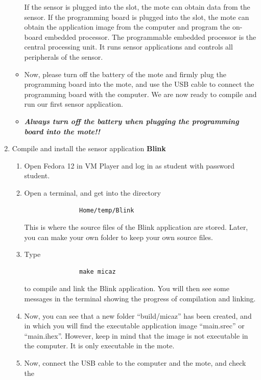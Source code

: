 \documentclass[letterpaper,12pt]{article}
\begin{document}
\begin{enumerate}
\begin{itemize}
               If the sensor is plugged into the slot, the mote can obtain data from the
               sensor. If the programming board is plugged into the slot, the mote can
               obtain the application image from the computer and program the on-board
               embedded processor. The programmable embedded processor is the central
               processing unit. It runs sensor applications and controls all peripherals
               of the sensor.
         \item Now, please turn off the battery of the mote and firmly plug the programming
               board into the mote, and use the USB cable to connect the programming board
               with the computer. We are now ready to compile and run our first sensor application.
         \item \emph{\textbf{Always turn off the battery when plugging the programming board into the mote!!}}
      \end{itemize}
   \item Compile and install the sensor application \textbf{Blink}
      \begin{enumerate}
         \item Open Fedora 12 in VM Player and log in as student with password student.
         \item Open a terminal, and get into the directory 
               \begin{lstlisting}
               Home/temp/Blink
               \end{lstlisting}
               This is where the source files of the Blink application are stored.
               Later, you can make your own folder to keep your own source files.
         \item Type 
               \begin{lstlisting}
               make micaz
               \end{lstlisting}
               to compile and link the Blink application. You will then see some messages in
               the terminal showing the progress of compilation and linking.
         \item Now, you can see that a new folder “build/micaz” has been created, and in
               which you will find the executable application image “main.srec” or “main.ihex”.
               However, keep in mind that the image is not executable in the computer.
               It is only executable in the mote.
         \item Now, connect the USB cable to the computer and the mote, and check the

\end{enumerate}
\end{enumerate}
\end{document}
